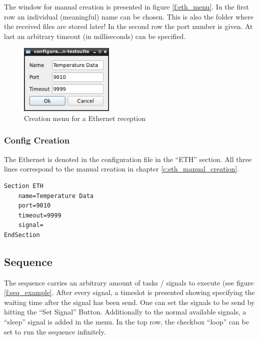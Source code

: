 \documentclass[10pt,a4paper]{article}
\begin{document}
	The window for manual creation is presented in figure \eqref{f:eth_menu}. In the first row an individual (meaningful) name can be chosen. This is also the folder where the received files are stored later! In the second row the port number is given. At last an arbitrary timeout (in milliseconds) can be specified.
	
	\begin{figure}[H]
	\centering
	\includegraphics[width=0.4\textwidth]{./8_ETH_menu.png}
	\caption{Creation menu for a Ethernet reception}
	\label{f:eth_menu}
	\end{figure}
	
	\subsubsection{Config Creation}
	
	The Ethernet is denoted in the configuration file in the \enquote{ETH} section. All three lines correspond to the manual creation in chapter \ref{c:eth_manual_creation}. 
	
\begin{lstlisting}[caption=ETH Config]
Section ETH
	name=Temperature Data
	port=9010
	timeout=9999
	signal=
EndSection
\end{lstlisting}
	
	\newpage
	\subsection{Sequence}
	The sequence carries an arbitrary amount of tasks / signals to execute (see figure \ref{f:seq_example}. After every signal, a timeslot is presented showing specifying the waiting time after the signal has been send. One can set the signals to be send by hitting the \enquote{Set Signal} Button. Additionally to the normal available signals, a \enquote{sleep} signal is added in the menu. In the top row, the checkbox \enquote{loop} can be set to run the sequence infinitely.
	
\end{document}
